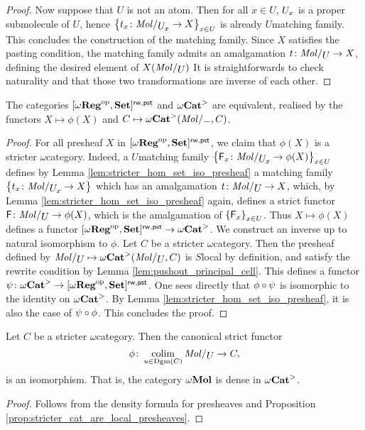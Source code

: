 \begin{proof}
    Now suppose that \( U \) is not an atom. 
    Then for all \( x \in U \), \( {U}_{x} \) is a proper submolecule of \( U \), hence \( \set{t_x \colon \molecin{\imel{U}{x}} \to X}_{x \in U} \) is already \( U \)\nbd matching family.
    This concludes the construction of the matching family.
    Since \( X \) satisfies the pasting condition, the matching family admits an amalgamation \( t \colon \molecin{U} \to X \), defining the desired element of \( X(\molecin{U}) \)
    It is straightforwards to check naturality and that those two transformations are inverse of each other.
\end{proof}

\begin{prop} \label{prop:stricter_cat_are_local_presheaves}
    The categories \( [\omega\mathbf{Reg}^\mathrm{op}, \mathbf{Set}]^{\mathsf{rw, pst}} \) and \( {\omega\mathbf{Cat}}^> \) are equivalent, realised by the functors \( X \mapsto \phi(X) \) and \( C \mapsto \somegaCat(\molecin{-}, C) \). 
\end{prop}
\begin{proof}
    For all presheaf \( X \) in \( [\omega\mathbf{Reg}^\mathrm{op}, \mathbf{Set}]^{\mathsf{rw, pst}} \), we claim that \( \phi(X) \) is a stricter \( \omega \)\nbd category.
    Indeed, a \( U \)\nbd matching family \( \set{\F_x \colon \molecin{\imel{U}{x}} \to \phi(X)}_{x \in U} \) defines by Lemma \ref{lem:stricter_hom_set_iso_presheaf} a matching family \( \set{t_x \colon \molecin{\imel{U}{x}} \to X} \) which has an amalgamation \( t \colon \molecin{U} \to X \), which, by Lemma \ref{lem:stricter_hom_set_iso_presheaf} again, defines a strict functor \( \F \colon \molecin{U} \to \phi(X) \), which is the amalgamation of \( \left\{ {\mathsf{F}_x} \right\}_{x \in U} \). 
    Thus \( X \mapsto \phi(X) \) defines a functor \( [\omega\mathbf{Reg}^\mathrm{op}, \mathbf{Set}]^{\mathsf{rw, pst}} \to {\omega\mathbf{Cat}}^> \).
    We construct an inverse up to natural isomorphism to \( \phi \).
    Let \( C \) be a stricter \( \omega \)\nbd category.
    Then the presheaf defined by \(\molecin{U} \mapsto \somegaCat(\molecin{U}, C) \) is \( S \)\nbd local by definition, and satisfy the rewrite condition by Lemma \ref{lem:pushout_principal_cell}.
    This defines a functor \( \psi \colon {\omega\mathbf{Cat}}^> \to [\omega\mathbf{Reg}^\mathrm{op}, \mathbf{Set}]^{\mathsf{rw, pst}} \).
    One sees directly that \( \phi \circ \psi \) is isomorphic to the identity on \( {\omega\mathbf{Cat}}^> \). 
    By Lemma \ref{lem:stricter_hom_set_iso_presheaf}, it is also the case of \( \psi \circ \phi \).
    This concludes the proof.
\end{proof}

\begin{cor} \label{cor:diagrams_are_dense} 
    Let \( C \) be a stricter \( \omega \)\nbd category.
    Then the canonical strict functor
    \begin{equation*}
        \phi \colon \colim_{u \in \Dgm(C)} \molecin{U} \to C,
    \end{equation*}
    is an isomorphism.
    That is, the category \( \omega\mathbf{Mol} \) is dense in \( {\omega\mathbf{Cat}}^> \).
\end{cor}
\begin{proof}
    Follows from the density formula for presheaves and Proposition \ref{prop:stricter_cat_are_local_presheaves}.
\end{proof}

